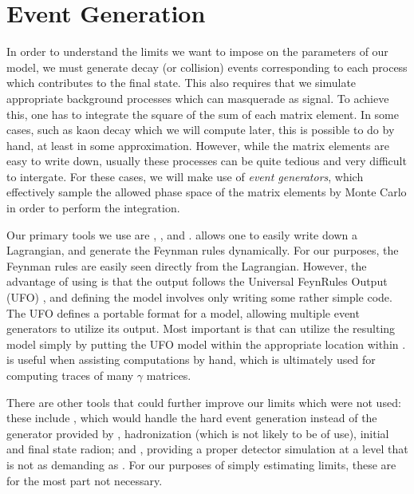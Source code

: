 \section{Event Generation}

In order to understand the limits we want to impose on the parameters of our model, we must generate decay (or collision) events corresponding to each process which contributes to the final state.
This also requires that we simulate appropriate background processes which can masquerade as signal.
To achieve this, one has to integrate the square of the sum of each matrix element.
In some cases, such as kaon decay which we will compute later, this is possible to do by hand, at least in some approximation.
However, while the matrix elements are easy to write down, usually these processes can be quite tedious and very difficult to intergate.
For these cases, we will make use of \emph{event generators}, which effectively sample the allowed phase space of the matrix elements by Monte Carlo in order to perform the integration.

Our primary tools we use are \feynrules \cite{Alloul:2013bka}, \feyncalc \cite{Mertig:1990an}, and \mgamcnlo \cite{Alwall:2014hca}.
\feynrules allows one to easily write down a Lagrangian, and generate the Feynman rules dynamically.
For our purposes, the Feynman rules are easily seen directly from the Lagrangian.
However, the advantage of using \feynrules is that the output follows the Universal FeynRules Output (UFO) \cite{Degrande:2011ua}, and defining the model involves only writing some rather simple \mathematica code.
The UFO defines a portable format for a model, allowing multiple event generators to utilize its output.
Most important is that \madgraph can utilize the resulting model simply by putting the UFO model within the appropriate location within \madgraph.
\feyncalc is useful when assisting computations by hand, which is ultimately used for computing traces of many $\gamma$ matrices.

There are other tools that could further improve our limits which were not used: these include \pythia \cite{Sjostrand:2007gs}, which would handle the hard event generation instead of the generator provided by \madgraph, hadronization (which is not likely to be of use), initial and final state radion; and \delphes \cite{Selvaggi:2014mya}, providing a proper detector simulation at a level that is not as demanding as \geant \cite{Agostinelli}. For our purposes of simply estimating limits, these are for the most part not necessary.

